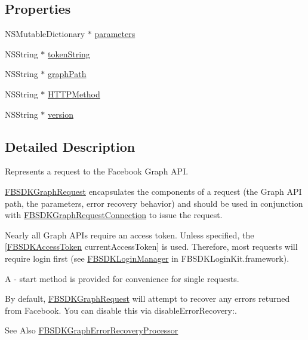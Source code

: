 \subsection*{Properties}
\begin{DoxyCompactItemize}
\item 
N\-S\-Mutable\-Dictionary $\ast$ \hyperlink{interface_f_b_s_d_k_graph_request_af769aa811f0eb9f2f1e56b4ac6e323e1}{parameters}
\item 
N\-S\-String $\ast$ \hyperlink{interface_f_b_s_d_k_graph_request_a96c19ad8e7bb79261467b812a70ef2c9}{token\-String}
\item 
N\-S\-String $\ast$ \hyperlink{interface_f_b_s_d_k_graph_request_a10e91143d0aa1301a527f43c60c53535}{graph\-Path}
\item 
N\-S\-String $\ast$ \hyperlink{interface_f_b_s_d_k_graph_request_a8a290580d36baf0de7aacf859a13902c}{H\-T\-T\-P\-Method}
\item 
N\-S\-String $\ast$ \hyperlink{interface_f_b_s_d_k_graph_request_a651d49b68ef87318eddd8d794843d165}{version}
\end{DoxyCompactItemize}


\subsection{Detailed Description}
Represents a request to the Facebook Graph A\-P\-I.

{\ttfamily \hyperlink{interface_f_b_s_d_k_graph_request}{F\-B\-S\-D\-K\-Graph\-Request}} encapsulates the components of a request (the Graph A\-P\-I path, the parameters, error recovery behavior) and should be used in conjunction with {\ttfamily \hyperlink{interface_f_b_s_d_k_graph_request_connection}{F\-B\-S\-D\-K\-Graph\-Request\-Connection}} to issue the request.

Nearly all Graph A\-P\-Is require an access token. Unless specified, the {\ttfamily \mbox{[}\hyperlink{interface_f_b_s_d_k_access_token}{F\-B\-S\-D\-K\-Access\-Token} current\-Access\-Token\mbox{]}} is used. Therefore, most requests will require login first (see {\ttfamily \hyperlink{interface_f_b_s_d_k_login_manager}{F\-B\-S\-D\-K\-Login\-Manager}} in F\-B\-S\-D\-K\-Login\-Kit.\-framework).

A {\ttfamily -\/ start} method is provided for convenience for single requests.

By default, \hyperlink{interface_f_b_s_d_k_graph_request}{F\-B\-S\-D\-K\-Graph\-Request} will attempt to recover any errors returned from Facebook. You can disable this via {\ttfamily disable\-Error\-Recovery\-:}. \begin{DoxySeeAlso}{See Also}
\hyperlink{interface_f_b_s_d_k_graph_error_recovery_processor}{F\-B\-S\-D\-K\-Graph\-Error\-Recovery\-Processor} 
\end{DoxySeeAlso}


